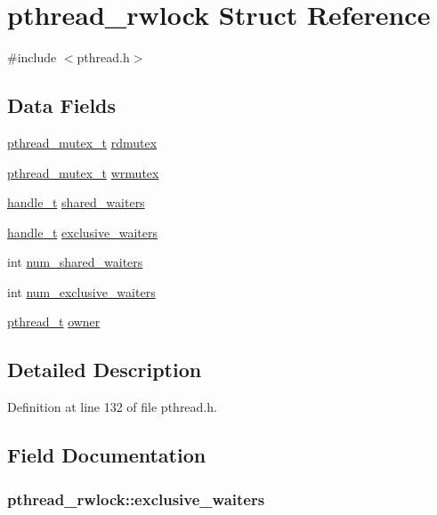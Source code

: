 \hypertarget{structpthread__rwlock}{\section{pthread\+\_\+rwlock Struct Reference}
\label{structpthread__rwlock}
}


{\ttfamily \#include $<$pthread.\+h$>$}

\subsection*{Data Fields}
\begin{DoxyCompactItemize}
\item 
\hyperlink{pthread_8h_ad613e9ad2d8d9713a8440618e7a70bba}{pthread\+\_\+mutex\+\_\+t} \hyperlink{structpthread__rwlock_aa525fa5ae59171418ede7d1894bf21fe}{rdmutex}
\item 
\hyperlink{pthread_8h_ad613e9ad2d8d9713a8440618e7a70bba}{pthread\+\_\+mutex\+\_\+t} \hyperlink{structpthread__rwlock_acebaf123f0d451e8aa6e7734c6bcca5b}{wrmutex}
\item 
\hyperlink{pthread_8h_aea4188cfb1472f9bb606fd2566133e34}{handle\+\_\+t} \hyperlink{structpthread__rwlock_a513e968cb2dea01c044a3304c26b1d07}{shared\+\_\+waiters}
\item 
\hyperlink{pthread_8h_aea4188cfb1472f9bb606fd2566133e34}{handle\+\_\+t} \hyperlink{structpthread__rwlock_ae49a53d46712b0d4af191e85a622da1d}{exclusive\+\_\+waiters}
\item 
int \hyperlink{structpthread__rwlock_af637581bd0ea0328763d041937160fff}{num\+\_\+shared\+\_\+waiters}
\item 
int \hyperlink{structpthread__rwlock_a5d8b56e7998376aa9f5908a560daadb7}{num\+\_\+exclusive\+\_\+waiters}
\item 
\hyperlink{pthread_8h_a6766c2345d5c6fe6407d9f6b844e584a}{pthread\+\_\+t} \hyperlink{structpthread__rwlock_a7918a35d8e929df9c7f1fd9f12e9efcf}{owner}
\end{DoxyCompactItemize}


\subsection{Detailed Description}


Definition at line 132 of file pthread.\+h.



\subsection{Field Documentation}
\hypertarget{structpthread__rwlock_ae49a53d46712b0d4af191e85a622da1d}{
\subsubsection[{exclusive\+\_\+waiters}]{ pthread\+\_\+rwlock\+::exclusive\+\_\+waiters}}\label{structpthread__rwlock_ae49a53d46712b0d4af191e85a622da1d}


